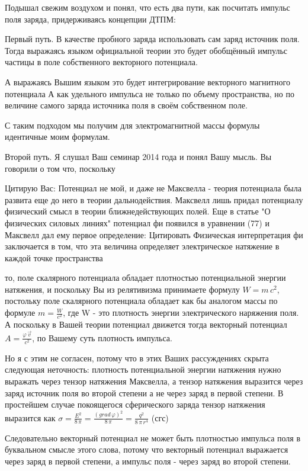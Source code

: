 \documentclass{article}
\begin{document}
Подышал свежим воздухом и понял, что есть два пути, как посчитать импульс поля заряда, придерживаясь концепции ДТПМ: 

Первый путь. В качестве пробного заряда использовать сам заряд источник поля. Тогда выражаясь языком официальной теории это будет обобщённый импульс частицы в поле собственного векторного потенциала.

А выражаясь Вышим языком это будет интегрирование  векторного магнитного потенциала А как удельного импульса  не только  по объему пространства, но по величине самого заряда источника поля в своём собственном поле. 

С таким подходом мы получим для электромагнитной массы формулы идентичные моим формулам.

Второй путь. Я слушал Ваш семинар 2014 года и понял Вашу мысль. Вы говорили о том что, поскольку

Цитирую Вас: Потенциал не мой, и даже не Максвелла - теория потенциала была развита еще до него в теории дальнодействия. Максвелл лишь придал потенциалу физический смысл в теории ближнедействующих полей. Еще в статье "О физических силовых линиях" потенциал фи появился в уравнении (77) и Максвелл дал ему первое определение:
Цитировать
Физическая интерпретация фи заключается в том, что эта величина определяет электрическое натяжение в каждой точке пространства


то, поле скалярного потенциала обладает плотностью потенциальной энергии натяжения, и поскольку Вы из релятивизма принимаете формулу $W = m\,c^2$, постольку поле скалярного потенциала обладает как бы аналогом массы по формуле $m = \frac{W}{c^2}$, где W - это плотность энергии электрического наряжения поля.
А поскольку в Вашей теории потенциал движется тогда векторный потенциал $A = \frac{\varphi\,\vec{v}}{c^2}$, по Вашему суть плотность импульса.

Но я с этим не согласен, потому что в этих Ваших рассуждениях скрыта следующая неточность: 
плотность потенциальной энергии натяжения нужно выражать через тензор натяжения Максвелла, а тензор натяжения выразится через заряд источник поля во второй степени а не через заряд в первой степени.
В простейшем случае покоящегося сферического заряда тензор натяжения выразится как $\sigma = \frac{E^2}{8\,\pi} =\frac{\left(grad\,\varphi\right)^2}{8\,\pi}=\frac{q^2}{8\,\pi\,r^4}$ (сгс)

Следовательно векторный потенциал не может быть плотностью импульса поля в буквальном смысле этого слова, потому что векторный потенциал выражается через заряд в первой степени, а импульс поля - через заряд во второй степени.
\end{document}
